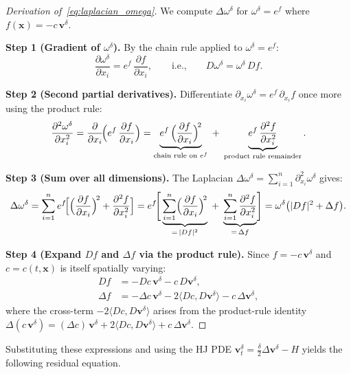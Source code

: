 \documentclass[11pt]{article}
\newcommand{\bx}{\bm{x}}
\newcommand{\bv}{\bm{v}}
\begin{document}
\begin{proof}[Derivation of~\eqref{eq:laplacian_omega}]
We compute $\Delta\omega^\delta$ for $\omega^\delta = e^f$ where $f(\bx) = -c\,\bv^\delta$.

\medskip
\noindent\textbf{Step 1 (Gradient of $\omega^\delta$).}
By the chain rule applied to $\omega^\delta = e^f$:
\[
  \frac{\partial\omega^\delta}{\partial x_i}
  = e^f\,\frac{\partial f}{\partial x_i},
  \qquad\text{i.e.,}\qquad
  D\omega^\delta = \omega^\delta\,Df.
\]

\noindent\textbf{Step 2 (Second partial derivatives).}
Differentiate $\partial_{x_i}\omega^\delta = e^f\,\partial_{x_i}f$ once more using the product rule:
\[
  \frac{\partial^2\omega^\delta}{\partial x_i^2}
  = \frac{\partial}{\partial x_i}\!\Bigl(e^f\,\frac{\partial f}{\partial x_i}\Bigr)
  = \underbrace{e^f\,\Bigl(\frac{\partial f}{\partial x_i}\Bigr)^{\!2}}_{\text{chain rule on }e^f}
    \;+\;\underbrace{e^f\,\frac{\partial^2 f}{\partial x_i^2}}_{\text{product rule remainder}}.
\]

\noindent\textbf{Step 3 (Sum over all dimensions).}
The Laplacian $\Delta\omega^\delta = \sum_{i=1}^{n}\partial^2_{x_i}\omega^\delta$ gives:
\[
  \Delta\omega^\delta
  = \sum_{i=1}^{n}e^f\!\Bigl[\Bigl(\frac{\partial f}{\partial x_i}\Bigr)^{\!2}
    + \frac{\partial^2 f}{\partial x_i^2}\Bigr]
  = e^f\!\Biggl[\,\underbrace{\sum_{i=1}^n\Bigl(\frac{\partial f}{\partial x_i}\Bigr)^{\!2}}_{=\,|Df|^2}
    \;+\;\underbrace{\sum_{i=1}^n\frac{\partial^2 f}{\partial x_i^2}}_{=\,\Delta f}\Biggr]
  = \omega^\delta\bigl(|Df|^2 + \Delta f\bigr).
\]

\noindent\textbf{Step 4 (Expand $Df$ and $\Delta f$ via the product rule).}
Since $f = -c\,\bv^\delta$ and $c = c(t,\bx)$ is itself spatially varying:
\begin{align*}
  Df &= -Dc\,\bv^\delta - c\,D\bv^\delta, \\
  \Delta f &= -\Delta c\,\bv^\delta
    - 2\langle Dc, D\bv^\delta\rangle
    - c\,\Delta\bv^\delta,
\end{align*}
where the cross-term $-2\langle Dc, D\bv^\delta\rangle$ arises from the
product-rule identity $\Delta(c\,\bv^\delta) = (\Delta c)\,\bv^\delta
+ 2\langle Dc, D\bv^\delta\rangle + c\,\Delta\bv^\delta$.
\end{proof}

Substituting these expressions and using the HJ PDE
$\bv_t^\delta = \frac{\delta}{2}\Delta\bv^\delta - H$ yields the following
residual equation.
\end{document}
